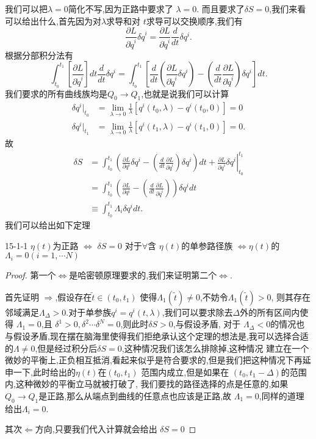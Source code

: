 \documentclass[../main.tex]{subfiles}
\begin{document}
 我们可以把$\lambda = 0$简化不写,因为正路中要求了 $\lambda = 0$. 而且要求了$\delta S = 0$,我们来看可以给出什么,首先因为对$\lambda$求导和对 $t$求导可以交换顺序,我们有\[
 \frac{\partial L}{\partial \dot{q}^i} \delta \dot{q}^i = \frac{\partial L}{\partial \dot{q}^i} \frac{d}{dt}\delta q^i
 .\] 
 根据分部积分法有\[
 \int^{t_1}_{t_0}[\frac{\partial L}{\partial \dot{q}^i}]dt \frac{d}{dt}\delta q^i = \int^{t_1}_{t_0}[\frac{d}{dt}(\frac{\partial L}{\partial \dot{q}^i} \delta q^i) - (\frac{d}{dt} \frac{\partial L}{\partial \dot{q}^i})\delta q^i]dt
 .\] 
 我们要求的所有曲线族均是$Q_0 \to Q_1$,也就是说我们可以计算
 \begin{align*}
 \delta q^i |_{t_0} &= \lim_{\lambda \to 0} \frac{1}{\lambda}[q^i(t_0,\lambda) - q^i(t_0,0)] = 0 \\ 
 \delta q^i |_{t_1} &= \lim_{\lambda \to 0} \frac{1}{\lambda}[q^i(t_1,\lambda) - q^i(t_1,0)] = 0
 .\end{align*}
 故
 \begin{align*}
 \delta S &=  \int^{t_1}_{t_0} \left( \frac{\partial L}{ \partial q^i}\delta q^i  - (\frac{d}{dt} \frac{\partial L}{\partial \dot{q}^i})\delta q^i \right) dt  + \left.\frac{\partial L}{\partial \dot{q}^i} \delta q^i\right|^{t_1}_{t_0}\\
          & = \int^{t_1}_{t_0} \left( \frac{\partial L}{ \partial q^i}  - (\frac{d}{dt} \frac{\partial L}{\partial \dot{q}^i}) \right) \delta q^i dt\\
          & \equiv \int^{t_1}_{t_0}\Lambda_i \delta q^i dt 
 .\end{align*}
 我们可以给出如下定理
 \begin{theorem}
 {}{15-1-1}
$\eta(t)$为正路 $\Longleftrightarrow$  $\delta S = 0$ 对于$\forall $含 $\eta(t)$的单参路径族  $\Longleftrightarrow \eta(t)$的$\Lambda_i = 0(i = 1,\cdots N)$ 
 \end{theorem}
 \begin{proof}
 第一个$\Longleftrightarrow$是哈密顿原理要求的,我们来证明第二个$\Longleftrightarrow$.

 首先证明 $\Rightarrow$,假设存在$\tilde{t} \in (t_0,t_1)$ 使得$\Lambda_1(\tilde{t}) \neq 0$,不妨令$\Lambda_1(\tilde{t}) > 0$,
 则其存在邻域满足$\Lambda_\Delta > 0$.对于单参族$q^i = q^i(t,\lambda)$,我们可以要求除去$\Delta$外的所有区间内使得 $\Lambda_1 = 0$,且 $\delta^1 > 0, \delta^2 \cdots \delta^N = 0$,则此时$\delta S > 0$,与假设矛盾,
 对于 $\Lambda_\Delta < 0$的情况也与假设矛盾,现在摆在脑海里使得我们拒绝承认这个定理的想法是,我可以选择合适的$\Lambda \neq 0$,但是经过积分后$\delta S = 0$,这种情况我们该怎么排除掉,这种情况
 建立在一个微妙的平衡上,正负相互抵消,看起来似乎是符合要求的,但是我们把这种情况下再延申一下,此时给出的$\eta(t)$在$(t_0,t_1)$ 范围内成立,但是如果在 $(t_0,t_1 -\Delta)$的范围内,这种微妙的平衡立马就被打破了,
 我们要找的路径选择的点是任意的,如果$Q_0 \to Q_1$是正路,那么从端点到曲线的任意点也应该是正路,故 $\Lambda_1 = 0$,同样的道理给出$\Lambda_i = 0$.

 其次$\Leftarrow$方向,只要我们代入计算就会给出 $\delta S = 0$
 \end{proof}
\end{document}
